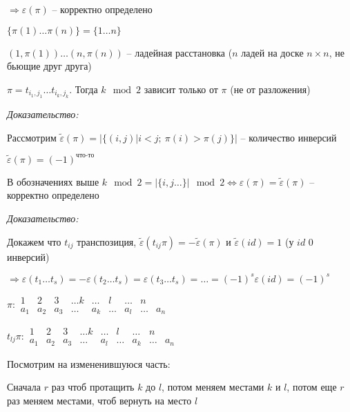 \documentclass[12pt]{article}
\begin{document}
$\Rightarrow \varepsilon(\pi)$ -- корректно определено

\begin{nota}{}
    $\{ \pi(1) \ldots \pi(n) \} = \{1 \ldots n\}$

    $(1, \pi(1)) \ldots (n, \pi(n))$ -- ладейная расстановка ($n$ ладей на доске $n \times n$, не бьющие друг друга)
\end{nota}

\begin{theo}{}
    $\pi = t_{i_1, j_1} \ldots t_{i_k, j_k}$. Тогда $k \mod 2$ зависит только от $\pi$ (не от разложения)
\end{theo}

\textit{Доказательство:}

Рассмотрим $\tilde{\varepsilon}(\pi) = |\{ (i, j) | i < j;\ \pi(i) > \pi(j) \}|$ -- количество инверсий

$\tilde{\varepsilon}(\pi) = (-1)^\text{что-то}$

\begin{propos}{}
    В обозначениях выше $k \mod 2 = | \{ i, j \ldots \} | \mod 2 \Leftrightarrow \varepsilon(\pi) = \tilde{\varepsilon}(\pi)$ -- корректно определено
\end{propos}

\textit{Доказательство:}

Докажем что $t_{ij}$ транспозиция, $\tilde{\varepsilon}(t_{ij}\pi) = - \tilde{\varepsilon}(\pi)$ и $\tilde{\varepsilon}(id) = 1$ (у $id$ 0 инверсий)

$\Rightarrow \varepsilon(t_1 \ldots t_s) = - \varepsilon(t_2 \ldots t_s) = \varepsilon(t_3 \ldots t_s) = \ldots = (-1)^s \varepsilon(id) = (-1)^s$

$\pi : \begin{matrix}
    1 & 2 & 3 & \ldots k & \ldots & l & \ldots & n \\
    a_1 & a_2 & a_3 & \ldots & a_k & \ldots & a_l & \ldots & a_n
\end{matrix}$

$t_{lj} \pi : \begin{matrix}
    1 & 2 & 3 & \ldots k & \ldots & l & \ldots & n \\
    a_1 & a_2 & a_3 & \ldots & a_l & \ldots & a_k & \ldots & a_n
\end{matrix}$

Посмотрим на измененившуюся часть:

Сначала $r$ раз чтоб протащить $k$ до $l$, потом меняем местами $k$ и $l$, потом еще $r$ раз меняем местами, чтоб вернуть на место $l$
    
\end{document}
